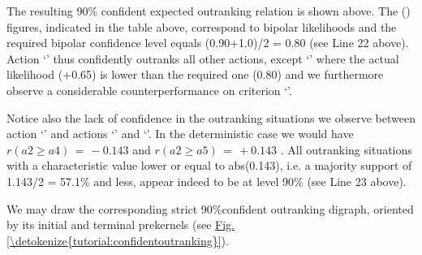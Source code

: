 \documentclass[a4paper,10pt,english]{sphinxhowto}
\begin{document}
The resulting 90\% confident expected outranking relation is shown above. The () figures, indicated in the table above, correspond to bipolar likelihoods and the required bipolar confidence level equals (0.90+1.0)/2 = 0.80 (see Line 22 above). Action ‘’ thus confidently outranks all other actions, except ‘’ where the actual likelihood (+0.65) is lower than the required one (0.80) and we furthermore observe a considerable counter\sphinxhyphen{}performance on criterion ‘’.

Notice also the lack of confidence in the outranking situations we observe between action ‘’ and actions ‘’ and ‘’. In the deterministic case we would have \(r(a2 \geq a4) \,=\, -0.143\) and \(r(a2 \geq a5) \,=\, +0.143\) . All outranking situations with a characteristic value lower or equal to abs(0.143), i.e. a majority support of 1.143/2 = 57.1\% and less, appear indeed to be  at level 90\% (see Line 23 above).

We may draw the corresponding strict 90\%\sphinxhyphen{}confident outranking digraph, oriented by its initial and terminal prekernels (see \hyperref[\detokenize{tutorial:confidentoutranking}]{Fig.\@ \ref{\detokenize{tutorial:confidentoutranking}}}).

\begin{sphinxVerbatim}[commandchars=\\\{\},numbers=left,firstnumber=1,stepnumber=1]
\end{sphinxVerbatim}
\end{document}
